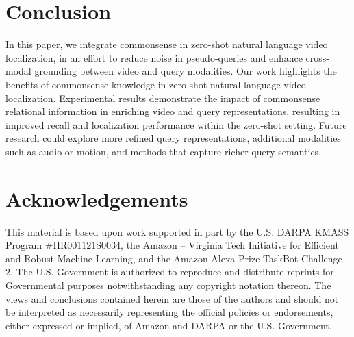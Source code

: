 \section{Conclusion}
In this paper, we integrate commonsense in zero-shot natural language video localization, in an effort to reduce noise in pseudo-queries and enhance cross-modal grounding between video and query modalities. Our work highlights the benefits of commonsense knowledge in zero-shot natural language video localization. Experimental results demonstrate the impact of commonsense relational information in enriching video and query representations, resulting in improved recall and localization performance within the zero-shot setting.
Future research could explore more refined query representations, additional modalities such as audio or motion, and methods that capture richer query semantics.

\section{Acknowledgements}\label{acknowledgement}
This material is based upon work supported in part by the U.S. DARPA KMASS Program \#HR001121S0034, the Amazon – Virginia Tech Initiative for Efficient and Robust Machine Learning, and the Amazon Alexa Prize TaskBot Challenge 2.  
The U.S. Government is authorized to reproduce and distribute reprints for Governmental purposes notwithstanding any copyright notation thereon.
The views and conclusions contained herein are those of the authors and should not be interpreted as necessarily representing the official policies or endorsements, either expressed or implied, of Amazon and DARPA or the U.S. Government.